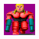 \documentclass[book.tex]{subfiles}
\begin{document}
      \begin{minipage}{.48\textwidth}
     \includegraphics[width=\textwidth]{imgs/sprites/gretel_hanse.png}
  \end{minipage}
\end{document}
